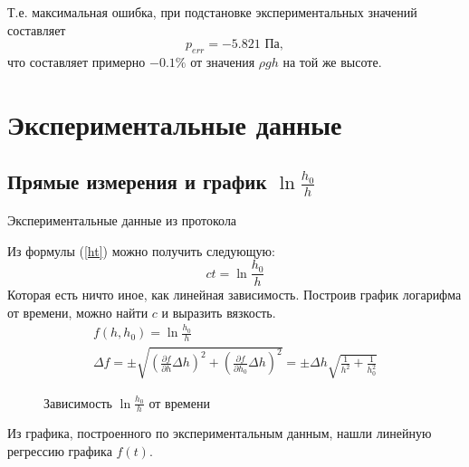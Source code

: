 \documentclass[a4paper,12pt]{article}%
\begin{document}
Т.е. максимальная ошибка, при подстановке экспериментальных значений составляет
\begin{equation}
	p_{err}=-5.821 \text{ Па},
\end{equation}
что составляет примерно $-0.1\%$ от значения $\rho g h$ на той же высоте.

\newpage
\section{Экспериментальные данные}
\subsection{Прямые измерения и график $\ln\frac{h_0}{h}$}

\begin{table}[H]
	\caption{Экспериментальные данные из протокола}
	\label{tab:m}
	\centering
	\pgfplotstabletypeset[
		columns={h,tt1,tt2,tt3,t,pln},	
	columns/h/.style={column name=$h'$},			
	columns/tt1/.style={column name=$t_1$},			
	columns/tt2/.style={column name=$t_2$},			
	columns/tt3/.style={column name=$t_3$},			
	columns/t/.style={column name=$<t>$},			
	columns/pln/.style={column name=$\ln\frac{h_0}{h}$},			
	]{\loadedtable}
\end{table}

Из формулы (\ref{ht}) можно получить следующую: 
\begin{equation}
	ct=\ln\frac{h_0}{h}
\end{equation}
Которая есть ничто иное, как линейная зависимость. Построив график логарифма от времени, можно найти $c$ и выразить вязкость.
\begin{gather}
	f(h,h_0)=\ln\frac{h_0}{h}\\
	\Delta f=
		\pm\sqrt{
			\left(
				\frac{\partial f}{\partial h}\Delta h
			\right)^2+
			\left(
				\frac{\partial f}{\partial h_0}\Delta h
			\right)^2			
		}=
	\pm\Delta h\sqrt{\frac{1}{h^2}+\frac{1}{h_0^2}}
\end{gather}

\begin{figure}[H]
	\centering
	
	\caption{Зависимость $\ln\frac{h_0}h$ от времени}
	\label{fig:ln}
\end{figure}
Из графика, построенного по экспериментальным данным, нашли линейную регрессию графика $f(t)$. 
\end{document}
